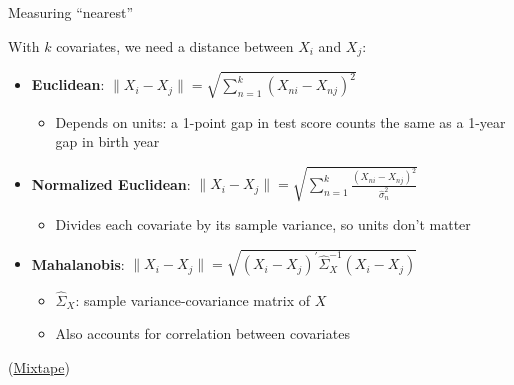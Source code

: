 \documentclass[compress, 8pt]{beamer}
\begin{document}
\begin{frame}{Measuring ``nearest''}

With $k$ covariates, we need a distance between $X_i$ and $X_j$:
\begin{itemize}
    \item \textbf{Euclidean}: $\lVert X_i - X_j \rVert = \sqrt{\sum_{n=1}^k (X_{ni} - X_{nj})^2}$
    \begin{itemize}
        \item Depends on units: a 1-point gap in test score counts the same as a 1-year gap in birth year
    \end{itemize}
    \item \textbf{Normalized Euclidean}: $\lVert X_i - X_j \rVert = \sqrt{\sum_{n=1}^k \frac{(X_{ni} - X_{nj})^2}{\hat{\sigma}_n^2}}$
    \begin{itemize}
        \item Divides each covariate by its sample variance, so units don't matter
    \end{itemize}
    \item \textbf{Mahalanobis}: $\lVert X_i - X_j \rVert = \sqrt{(X_i - X_j)^\prime \hat{\Sigma}_X^{-1} (X_i - X_j)}$
    \begin{itemize}
        \item {\color{DarkGray}$\hat{\Sigma}_X$: sample variance-covariance matrix of $X$}
        \item Also accounts for correlation between covariates
    \end{itemize}
\end{itemize}
(\href{https://mixtape.scunning.com/05-causal_cross_sectional_designs\#nearest-neighbors-in-multiple-dimensions-and-minimized-distance}{Mixtape})

\end{frame}
\end{document}
